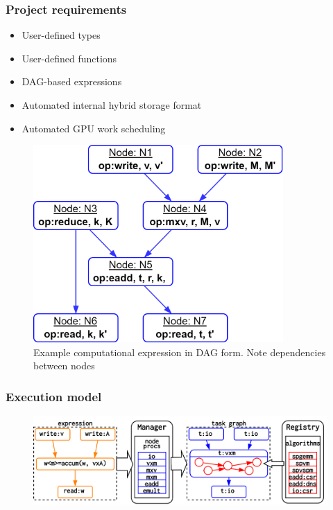 \documentclass[aspectratio=169,xcolor=table,english]{beamer}
\begin{document}
\begin{frame}[fragile] \frametitle{Project requirements}
    \begin{minipage}[m]{0.55\linewidth}
        \begin{itemize}
            \item User-defined types
            \item User-defined functions 
            \item DAG-based expressions
            \item Automated internal hybrid storage format
            \item Automated GPU work scheduling
        \end{itemize}
    \end{minipage}\hfill
    \begin{minipage}[m]{0.45\linewidth}
        \begin{figure}
            \centering
            \includegraphics[width=0.85\textwidth]{figures/example_expression.png}
            \caption{Example computational expression in DAG form. Note dependencies between nodes}
            \label{fig:example_expression}
        \end{figure}
    \end{minipage}
\end{frame}

\begin{frame}[fragile] \frametitle{Execution model}
    \begin{center}
    \begin{minipage}[m]{0.9\linewidth}
        \begin{figure}
            \centering
            \includegraphics[width=1.0\textwidth]{figures/execution_schema.png}
        \end{figure}
    \end{minipage}\hfill   
    \end{center}
\end{frame}
\end{document}
